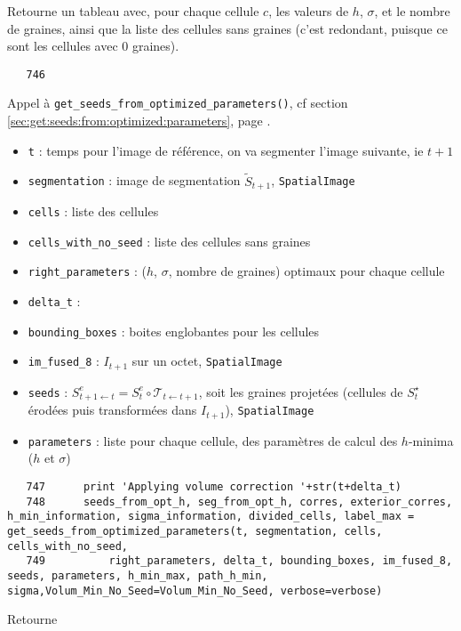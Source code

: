\documentclass{article}
\def \mycolor {red}
\begin{document}
Retourne un tableau avec, pour chaque cellule $c$, les valeurs de $h$, $\sigma$, et le nombre de graines, ainsi que la liste des cellules sans graines (c'est redondant, puisque ce sont les cellules avec 0 graines).
\color{black}
\begin{verbatim}
   746	    
\end{verbatim} 
\color{\mycolor}
Appel \`a \texttt{get\_seeds\_from\_optimized\_parameters()}, cf section \ref{sec:get:seeds:from:optimized:parameters}, page \pageref{sec:get:seeds:from:optimized:parameters}.
\begin{itemize}
\itemsep -1ex
\item \verb|t| : temps pour l'image de r\'ef\'erence, on va segmenter l'image suivante, ie $t+1$
\item \verb|segmentation| :  image de segmentation $\tilde{S}_{t+1}$, \texttt{SpatialImage}
\item \verb|cells| : liste des cellules
\item \verb|cells_with_no_seed| : liste des cellules sans graines
\item \verb|right_parameters| : ($h$, $\sigma$, nombre de graines) optimaux pour chaque cellule
\item \verb|delta_t| :
\item \verb|bounding_boxes| : boites englobantes pour les cellules
\item \verb|im_fused_8| : $I_{t+1}$ sur un octet, \texttt{SpatialImage}
\item \verb|seeds| : $S^e_{t+1 \leftarrow t} = S^e_t \circ \mathcal{T}_{t \leftarrow t+1}$, soit les graines projet\'ees (cellules de $S^{\star}_t$ \'erod\'ees puis transform\'ees dans $I_{t+1}$), \texttt{SpatialImage}
\item \verb|parameters| : liste pour chaque cellule,  des param\`etres de calcul des $h$-minima ($h$ et $\sigma$)
\end{itemize}
\color{black}
\begin{verbatim} 
   747	    print 'Applying volume correction '+str(t+delta_t)
   748	    seeds_from_opt_h, seg_from_opt_h, corres, exterior_corres, h_min_information, sigma_information, divided_cells, label_max = get_seeds_from_optimized_parameters(t, segmentation, cells, cells_with_no_seed, 
   749	        right_parameters, delta_t, bounding_boxes, im_fused_8, seeds, parameters, h_min_max, path_h_min, sigma,Volum_Min_No_Seed=Volum_Min_No_Seed, verbose=verbose)
\end{verbatim}
\color{\mycolor}
Retourne
\end{document}
